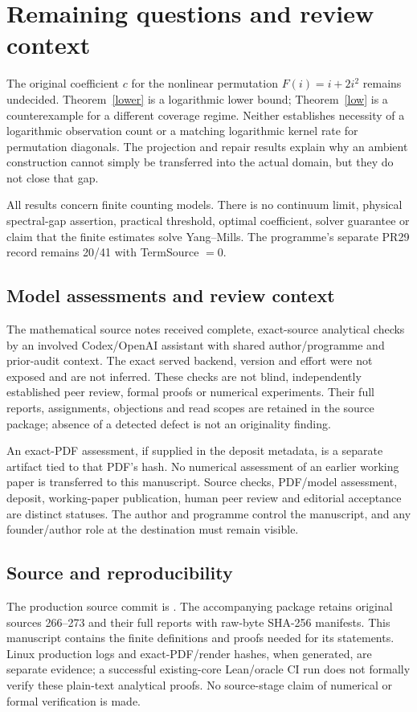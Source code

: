 \documentclass[11pt,a4paper]{article}
\providecommand{\SourceCommit}{\errmessage{Supply the frozen SourceCommit}}
\begin{document}
\section{Remaining questions and review context}
The original coefficient $c$ for the nonlinear permutation $F(i)=i+2i^2$
remains undecided. Theorem~\ref{lower} is a logarithmic lower bound;
Theorem~\ref{low} is a counterexample for a different coverage regime.
Neither establishes necessity of a logarithmic observation count or a
matching logarithmic kernel rate for permutation diagonals. The projection
and repair results explain why an ambient construction cannot simply be
transferred into the actual domain, but they do not close that gap.

All results concern finite counting models. There is no continuum limit,
physical spectral-gap assertion, practical threshold, optimal coefficient,
solver guarantee or claim that the finite estimates solve Yang--Mills.
The programme's separate PR29 record remains 20/41 with TermSource $=0$.

\subsection*{Model assessments and review context}
The mathematical source notes received complete, exact-source analytical
checks by an involved Codex/OpenAI assistant with shared author/programme and
prior-audit context. The exact served backend, version and effort were not
exposed and are not inferred. These checks are not blind, independently
established peer review, formal proofs or numerical experiments. Their full
reports, assignments, objections and read scopes are retained in the source
package; absence of a detected defect is not an originality finding.

An exact-PDF assessment, if supplied in the deposit metadata, is a separate
artifact tied to that PDF's hash. No numerical assessment of an earlier
working paper is transferred to this manuscript. Source checks, PDF/model
assessment, deposit, working-paper publication, human peer review and editorial
acceptance are distinct statuses. The author and programme control the
manuscript, and any founder/author role at the destination must remain visible.

\subsection*{Source and reproducibility}
The production source commit is
\texttt{\SourceCommit}. The accompanying package retains original sources
266--273 and their full reports with raw-byte SHA-256 manifests. This manuscript
contains the finite definitions and proofs needed for its statements. Linux
production logs and exact-PDF/render hashes, when generated, are separate
evidence; a successful existing-core Lean/oracle CI run does not formally verify
these plain-text analytical proofs. No source-stage claim of numerical or
formal verification is made.
\end{document}

